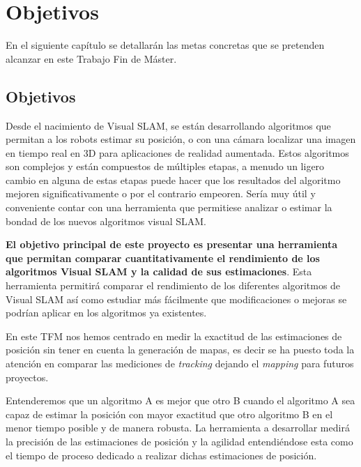\chapter{Objetivos} \label{cap:Objetivos}


En el siguiente capítulo se detallarán las metas concretas que se pretenden alcanzar en este Trabajo Fin de Máster.

\section{Objetivos}
Desde el nacimiento de Visual SLAM, se están desarrollando algoritmos que permitan a los robots estimar su posición, o con una cámara localizar una imagen en tiempo real en 3D para aplicaciones de realidad aumentada. Estos algoritmos son complejos y están compuestos de múltiples etapas, a menudo un ligero cambio en alguna de estas etapas puede hacer que los resultados del algoritmo mejoren significativamente o por el contrario empeoren. Sería muy útil y conveniente contar con una herramienta que permitiese analizar o estimar la bondad de los nuevos algoritmos visual SLAM.

\textbf{El objetivo principal de este proyecto es presentar una herramienta que permitan comparar cuantitativamente el rendimiento de los algoritmos Visual SLAM y la calidad de sus estimaciones}.
Esta herramienta permitirá comparar el rendimiento de los diferentes algoritmos de Visual SLAM así como estudiar más fácilmente que modificaciones o mejoras se podrían aplicar en los algoritmos ya existentes.

En  este TFM nos hemos centrado en medir la exactitud de las estimaciones de posición sin tener en cuenta la generación de mapas, es decir se ha puesto toda la atención en comparar las mediciones de \textit{tracking} dejando el \textit{mapping} para futuros proyectos. 

Entenderemos que un algoritmo A es mejor que otro B cuando el algoritmo A sea capaz de estimar la posición con mayor exactitud que otro algoritmo B en el menor tiempo posible y de manera robusta. La herramienta a desarrollar medirá la precisión de las estimaciones de posición y la agilidad entendiéndose esta como el tiempo de proceso dedicado a realizar dichas estimaciones de posición. 


